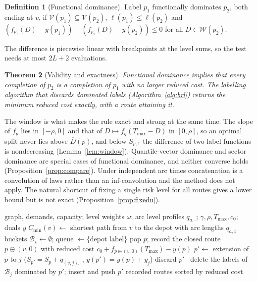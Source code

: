 \documentclass[preprint,12pt]{elsarticle}
\newtheorem{theorem}{Theorem}
\theoremstyle{definition}
\newtheorem{definition}[theorem]{Definition}
\theoremstyle{remark}
\newcommand{\Dh}{\overline{D}}
\begin{document}
\begin{definition}[Functional dominance]\label{def:fdom}
Label $p_1$ functionally dominates $p_2$, both ending at $v$, if $\mathcal V(p_1)\subseteq\mathcal V(p_2)$, $\ell(p_1)\le\ell(p_2)$ and $(f_{p_1}(D)-y(p_1))-(f_{p_2}(D)-y(p_2))\le0$ for all $D\in\mathcal W(p_2)$.
\end{definition}

The difference is piecewise linear with breakpoints at the level sums, so the test needs at most $2L+2$ evaluations.

\begin{theorem}[Validity and exactness]\label{thm:fdom}
Functional dominance implies that every completion of $p_2$ is a completion of $p_1$ with no larger reduced cost. The labelling algorithm that discards dominated labels (Algorithm~\ref{alg:brl}) returns the minimum reduced cost exactly, with a route attaining it.
\end{theorem}

The window is what makes the rule exact and strong at the same time. The slope of $f_p$ lies in $[-\rho,0]$ and that of $D\mapsto f_q(T_{\max}-D)$ in $[0,\rho]$, so an optimal split never lies above $\Dh(p)$, and below $S_{p,1}$ the difference of two label functions is nondecreasing (Lemma~\ref{lem:window}). Quantile-vector dominance and sector dominance are special cases of functional dominance, and neither converse holds (Proposition~\ref{prop:compare}). Under independent arc times concatenation is a convolution of laws rather than an inf-convolution and the method does not apply. The natural shortcut of fixing a single risk level for all routes gives a lower bound but is not exact (Proposition~\ref{prop:fixedu}).

\begin{algorithm}[t]
\caption{BRL pricing for the dependence-robust routing problem ($H=1$)}\label{alg:brl}
\begin{algorithmic}[1]
\Require graph, demands, capacity; level weights $\omega$; arc level profiles $q_{a,\cdot}$; $\gamma,\rho,T_{\max},c_0$; duals $y$
\State $C_{\min}(v)\gets$ shortest path from $v$ to the depot with arc lengths $q_{a,1}$
\State buckets $\mathcal B_v\gets\emptyset$; queue $\gets\{$depot label$\}$
  \State pop $p$; record the closed route $p\oplus(v,0)$ with reduced cost $c_0+f_{p\oplus(v,0)}(T_{\max})-y(p)$
    \State $p'\gets$ extension of $p$ to $j$ ($S_{p'}=S_p+q_{(v,j),\cdot}$, $y(p')=y(p)+y_j$)
     discard $p'$
    \Else\ delete the labels of $\mathcal B_j$ dominated by $p'$; insert and push $p'$
    \EndIf
  \EndFor
\EndWhile
\State \Return recorded routes sorted by reduced cost
\end{algorithmic}
\end{algorithm}
\end{document}
